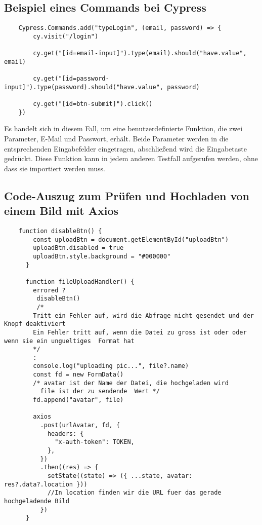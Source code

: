 \subsection{Beispiel eines Commands bei Cypress}\label{subsec_UabsAnhang}
\begin{lstlisting}
    Cypress.Commands.add("typeLogin", (email, password) => {
        cy.visit("/login")
    
        cy.get("[id=email-input]").type(email).should("have.value", email)
    
        cy.get("[id=password-input]").type(password).should("have.value", password)
    
        cy.get("[id=btn-submit]").click()
    })
\end{lstlisting}
Es handelt sich in diesem Fall, um eine benutzerdefinierte Funktion, die zwei Parameter, E-Mail und Passwort, erhält. 
Beide Parameter werden in die entsprechenden Eingabefelder eingetragen, abschließend wird die Eingabetaste gedrückt.
Diese Funktion kann in jedem anderen Testfall aufgerufen werden, ohne dass sie importiert werden muss.

\subsection{Code-Auszug zum Prüfen und Hochladen von einem Bild mit Axios}\label{subsec_UabsAnhang}
\begin{lstlisting}
    function disableBtn() {
        const uploadBtn = document.getElementById("uploadBtn")
        uploadBtn.disabled = true
        uploadBtn.style.background = "#000000"
      }
    
      function fileUploadHandler() {
        errored ? 
         disableBtn()
         /*
        Tritt ein Fehler auf, wird die Abfrage nicht gesendet und der Knopf deaktiviert 
        Ein Fehler tritt auf, wenn die Datei zu gross ist oder oder wenn sie ein ungueltiges  Format hat
        */
        :
        console.log("uploading pic...", file?.name)
        const fd = new FormData()
        /* avatar ist der Name der Datei, die hochgeladen wird
          file ist der zu sendende  Wert */
        fd.append("avatar", file)  
    
        axios
          .post(urlAvatar, fd, {
            headers: {
              "x-auth-token": TOKEN,
            },
          })
          .then((res) => {
            setState((state) => ({ ...state, avatar: res?.data?.location }))    
            //In location finden wir die URL fuer das gerade hochgeladende Bild 
          })
      }\end{lstlisting}

